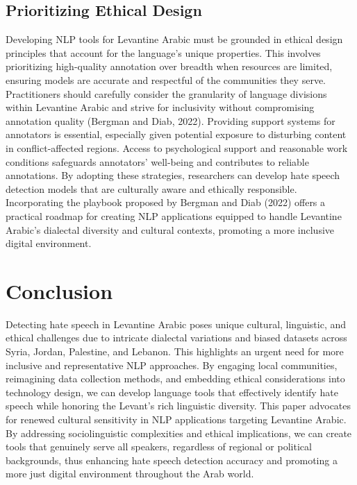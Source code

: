 \documentclass[11pt]{article}
\begin{document}
\subsection{Prioritizing Ethical Design}

Developing NLP tools for Levantine Arabic must be grounded in ethical design principles that account for the language's unique properties. This involves prioritizing high-quality annotation over breadth when resources are limited, ensuring models are accurate and respectful of the communities they serve. Practitioners should carefully consider the granularity of language divisions within Levantine Arabic and strive for inclusivity without compromising annotation quality (Bergman and Diab, 2022). Providing support systems for annotators is essential, especially given potential exposure to disturbing content in conflict-affected regions. Access to psychological support and reasonable work conditions safeguards annotators' well-being and contributes to reliable annotations. By adopting these strategies, researchers can develop hate speech detection models that are culturally aware and ethically responsible. Incorporating the playbook proposed by Bergman and Diab (2022) offers a practical roadmap for creating NLP applications equipped to handle Levantine Arabic's dialectal diversity and cultural contexts, promoting a more inclusive digital environment.


\section{Conclusion}

Detecting hate speech in Levantine Arabic poses unique cultural, linguistic, and ethical challenges due to intricate dialectal variations and biased datasets across Syria, Jordan, Palestine, and Lebanon. This highlights an urgent need for more inclusive and representative NLP approaches. By engaging local communities, reimagining data collection methods, and embedding ethical considerations into technology design, we can develop language tools that effectively identify hate speech while honoring the Levant's rich linguistic diversity. This paper advocates for renewed cultural sensitivity in NLP applications targeting Levantine Arabic. By addressing sociolinguistic complexities and ethical implications, we can create tools that genuinely serve all speakers, regardless of regional or political backgrounds, thus enhancing hate speech detection accuracy and promoting a more just digital environment throughout the Arab world.
\end{document}
